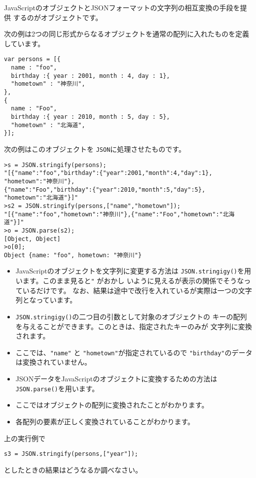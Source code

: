 JavaScriptのオブジェクトとJSONフォーマットの文字列の相互変換の手段を提供
するのがオブジェクトです。

次の例は2つの同じ形式からなるオブジェクトを通常の配列に入れたものを定義
 しています。
\begin{Verbatim}
var persons = [{
  name : "foo",
  birthday :{ year : 2001, month : 4, day : 1},
  "hometown" : "神奈川",
},
{
  name : "Foo",
  birthday :{ year : 2010, month : 5, day : 5},
  "hometown" : "北海道",
}];
\end{Verbatim}
次の例はこのオブジェクトを \texttt{JSON}に処理させたものです。
\begin{Verbatim}
>s = JSON.stringify(persons);
"[{"name":"foo","birthday":{"year":2001,"month":4,"day":1},
"hometown":"神奈川"},
{"name":"Foo","birthday":{"year":2010,"month":5,"day":5},
"hometown":"北海道"}]"
>s2 = JSON.stringify(persons,["name","hometown"]);
"[{"name":"foo","hometown":"神奈川"},{"name":"Foo","hometown":"北海道"}]"
>o = JSON.parse(s2);
[Object, Object]
>o[0];
Object {name: "foo", hometown: "神奈川"}
\end{Verbatim}
\begin{itemize}
 \item JavaScriptのオブジェクトを文字列に変更する方法は
       \texttt{JSON.stringigy()}を用います。このまま見ると\verb+"+%
			 がおかし
       いように見えるが表示の関係でそうなっているだけです。
なお、結果は途中で改行を入れているが実際は一つの文字列となっています。
 \item \texttt{JSON.stringigy()}の二つ目の引数として対象のオブジェクトの
       キーの配列を与えることができます。このときは、指定されたキーのみが
       文字列に変換されます。
 \item ここでは、\verb+"name"+ と \verb+"hometown"+が指定されているので
\verb+"birthday"+のデータは変換されていません。
 \item JSONデータをJavaScriptのオブジェクトに変換するための方法は
       \texttt{JSON.parse()}を用います。
 \item ここではオブジェクトの配列に変換されたことがわかります。
 \item 各配列の要素が正しく変換されていることがわかります。
\end{itemize}

\begin{Problem}\upshape
上の実行例で%
\begin{Verbatim}
s3 = JSON.stringify(persons,["year"]);
\end{Verbatim}
としたときの結果はどうなるか調べなさい。
\end{Problem}


